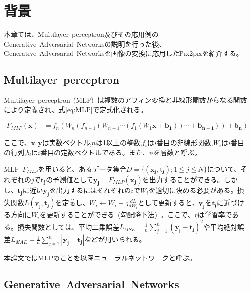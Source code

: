 
\chapter{背景}

本章では、Multilayer~perceptron及びその応用例のGenerative~Adversarial~Networksの説明を行った後、Generative~Adversarial~Networksを画像の変換に応用したPix2pixを紹介する。

\section{Multilayer~perceptron}

Multilayer~perceptron~(MLP)~は複数のアフィン変換と非線形関数からなる関数により定義され、式\ref{eq:MLP}で定式化される。

\begin{align}
    \label{eq:MLP}
    F_{MLP}(\boldsymbol{x})&=f_{n}(W_{n}(f_{n-1}(W_{n-1}\cdots(f_{1}(W_{1}\boldsymbol{x}+\boldsymbol{b_{1}}))\cdots+\boldsymbol{b_{n-1}}))+\boldsymbol{b_{n}})
\end{align}

ここで、$\boldsymbol{x},\boldsymbol{y}$は実数ベクトル,$n$は1以上の整数,$f_{i}$は$i$番目の非線形関数,$W_{i}$は$i$番目の行列,$b_{i}$は$i$番目の定数ベクトルである。また、$n$を層数と呼ぶ。

MLP~$F_{MLP}$を用いると、あるデータ集合$D=\{(\boldsymbol{x_j},\boldsymbol{t_j}); 1 \leqq j \leqq N\}$について、それぞれの$j$で$\boldsymbol{t_{j}}$の予測値として$\boldsymbol{y_j}=F_{MLP}(\boldsymbol{x_j})$を出力することができる。しかし、$\boldsymbol{t_j}$に近い$\boldsymbol{y_j}$を出力するにはそれぞれの$i$で$W_i$を適切に決める必要がある。損失関数$L(\boldsymbol{y_j},\boldsymbol{t_j})$を定義し、$W _i \leftarrow W_i - \eta \frac{d L}{dW_i}$として更新すると、$\boldsymbol{y_j}$を$\boldsymbol{t_j}$に近づける方向に$W_i$を更新することができる~(勾配降下法)~。ここで、$\eta$は学習率である。損失関数としては、平均二乗誤差$L_{MSE}=\frac{1}{n}\sum _{j=1} ^{n} {(\boldsymbol{y_j} - \boldsymbol{t_j})^2}$や平均絶対誤差$L_{MAE}=\frac{1}{n}\sum _{j=1} ^{n} {|\boldsymbol{y_j} - \boldsymbol{t_j}|}$などが用いられる。

本論文ではMLPのことを以降ニューラルネットワークと呼ぶ。

\section{Generative~Adversarial~Networks}

